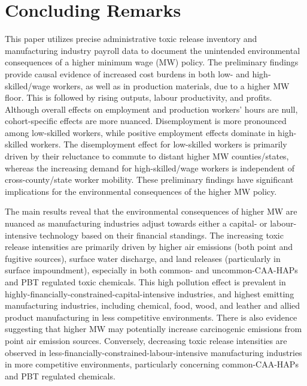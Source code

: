 \documentclass[12pt, english]{article}
\begin{document}
    \section{Concluding Remarks}\label{sec:concluding-remarks}
    This paper utilizes precise administrative toxic release inventory and manufacturing industry payroll data to document the unintended environmental consequences of a higher minimum wage (MW) policy. The preliminary findings provide causal evidence of increased cost burdens in both low- and high-skilled/wage workers, as well as in production materials, due to a higher MW floor. This is followed by rising outputs, labour productivity, and profits. Although overall effects on employment and production workers' hours are null, cohort-specific effects are more nuanced. Disemployment is more pronounced among low-skilled workers, while positive employment effects dominate in high-skilled workers. The disemployment effect for low-skilled workers is primarily driven by their reluctance to commute to distant higher MW counties/states, whereas the increasing demand for high-skilled/wage workers is independent of cross-county/state worker mobility. These preliminary findings have significant implications for the environmental consequences of the higher MW policy.

    The main results reveal that the environmental consequences of higher MW are nuanced as manufacturing industries adjust towards either a capital- or labour-intensive technology based on their financial standings. The increasing toxic release intensities are primarily driven by higher air emissions (both point and fugitive sources), surface water discharge, and land releases (particularly in surface impoundment), especially in both common- and uncommon-CAA-HAPs and PBT regulated toxic chemicals. This high pollution effect is prevalent in highly-financially-constrained-capital-intensive industries, and highest emitting manufacturing industries, including chemical, food, wood, and leather and allied product manufacturing in less competitive environments. There is also evidence suggesting that higher MW may potentially increase carcinogenic emissions from point air emission sources. Conversely, decreasing toxic release intensities are observed in less-financially-constrained-labour-intensive manufacturing industries in more competitive environments, particularly concerning common-CAA-HAPs and PBT regulated chemicals.
\end{document}

